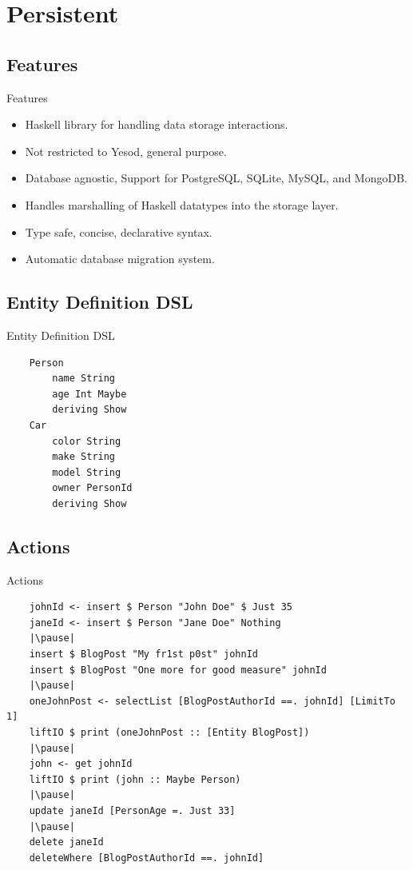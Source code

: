 \documentclass[pdf]{beamer}
\begin{document}
\section{Persistent}
\subsection{Features}
\begin{frame}{Features}
  \begin{itemize}
  \item<1-> Haskell library for handling data storage interactions.
  \item<2-> Not restricted to Yesod, general purpose.
  \item<3-> Database agnostic, Support for PostgreSQL, SQLite, MySQL, and MongoDB.
  \item<4-> Handles marshalling of Haskell datatypes into the storage layer.
  \item<5-> Type safe, concise, declarative syntax.
  \item<6-> Automatic database migration system.
  \end{itemize}
\end{frame}

\subsection{Entity Definition DSL}
\begin{frame}[fragile]{Entity Definition DSL}
  \begin{verbatim}
    Person
        name String
        age Int Maybe
        deriving Show
    Car
        color String
        make String
        model String
        owner PersonId
        deriving Show
  \end{verbatim}
\end{frame}

\subsection{Actions}
\begin{frame}[fragile]{Actions}
  \begin{verbatim}
    johnId <- insert $ Person "John Doe" $ Just 35
    janeId <- insert $ Person "Jane Doe" Nothing
    |\pause|
    insert $ BlogPost "My fr1st p0st" johnId
    insert $ BlogPost "One more for good measure" johnId
    |\pause|
    oneJohnPost <- selectList [BlogPostAuthorId ==. johnId] [LimitTo 1]
    liftIO $ print (oneJohnPost :: [Entity BlogPost])
    |\pause|
    john <- get johnId
    liftIO $ print (john :: Maybe Person)
    |\pause|
    update janeId [PersonAge =. Just 33]
    |\pause|
    delete janeId
    deleteWhere [BlogPostAuthorId ==. johnId]
  \end{verbatim}
\end{frame}
\end{document}
